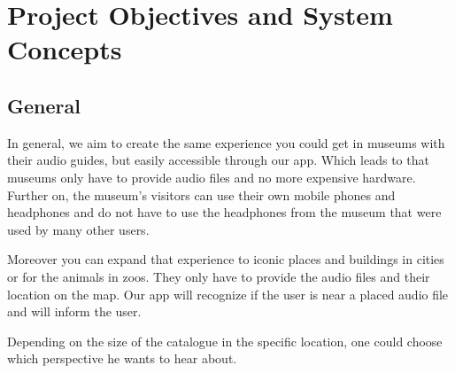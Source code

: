 \documentclass[12pt]{article}
\theoremstyle{definition}
\newenvironment{text}{
}{}
\begin{document}
\pagebreak
 
\section{Project Objectives and System Concepts}
 
\subsection{General}
\begin{text}
In general, we aim to create the same experience you could get in museums with their audio guides, but easily accessible through our app. Which leads to that museums only have to provide audio files and no more expensive hardware. Further on, the museum's visitors can use their own mobile phones and headphones and do not have to use the headphones from the museum that were used by many other users.

Moreover you can expand that experience to iconic places and buildings in cities or for the animals in zoos. They only have to provide the audio files and their location on the map. Our app will recognize if the user is near a placed audio file and will inform the user.

Depending on the size of the catalogue in the specific location, one could choose which perspective he wants to hear about.
\end{text}
 
\end{document}
